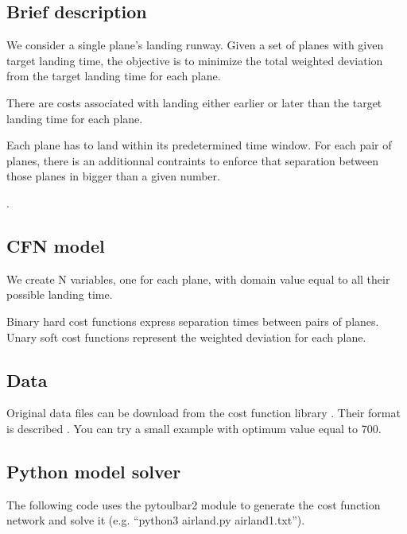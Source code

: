 \documentclass[letterpaper,10pt,openany,oneside,english]{sphinxmanual}
\begin{document}
\subsection{Brief description}
\label{\detokenize{examples/tuto_alp:brief-description}}
\sphinxAtStartPar
We consider a single plane’s landing runway.
Given a set of planes with given target landing time, the objective is to minimize the total weighted deviation from the target landing time for each plane.

\sphinxAtStartPar
There are costs associated with landing either earlier or later than the target landing time for each plane.

\sphinxAtStartPar
Each plane has to land within its predetermined time window.
For each pair of planes, there is an additionnal contraints to enforce that separation between those planes in bigger than a given number.

\sphinxAtStartPar
{}.


\subsection{CFN model}
\label{\detokenize{examples/tuto_alp:cfn-model}}
\sphinxAtStartPar
We create N variables, one for each plane, with domain value equal to all their possible landing time.

\sphinxAtStartPar
Binary hard cost functions express separation times between pairs of planes. Unary soft cost functions represent the weighted deviation for each plane.


\subsection{Data}
\label{\detokenize{examples/tuto_alp:data}}
\sphinxAtStartPar
Original data files can be download from the cost function library . Their format is described . You can try a small example  with optimum value equal to 700.


\subsection{Python model solver}
\label{\detokenize{examples/tuto_alp:python-model-solver}}
\sphinxAtStartPar
The following code uses the pytoulbar2 module to generate the cost function network and solve it (e.g. “python3 airland.py airland1.txt”).
\end{document}
